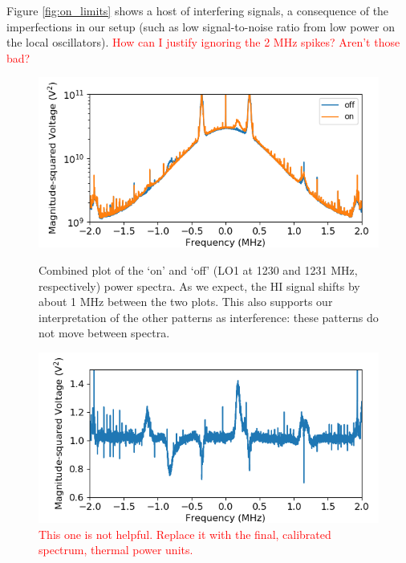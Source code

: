 \documentclass[12pt]{article}
\begin{document}
Figure \ref{fig:on_limits} shows a host of interfering signals, a consequence of the imperfections in our setup (such as low signal-to-noise ratio from low power on the local oscillators). \textcolor{red}{How can I justify ignoring the 2 MHz spikes? Aren't those bad?}

\begin{figure}
\centering
\begin{minipage}{.45\textwidth}
	\centering
	\includegraphics[width=\linewidth]{up_on_off}
	\caption{Combined plot of the `on' and `off' (LO1 at 1230 and 1231 MHz, respectively) power spectra. As we expect, the HI signal shifts by about 1 MHz between the two plots. This also supports our interpretation of the other patterns as interference: these patterns do not move between spectra.}
	\label{fig:up_on_off}
\end{minipage} \hfill%
\begin{minipage}{.45\textwidth}
	\centering
	\includegraphics[width=\linewidth]{up_shape}
	\caption{\textcolor{red}{This one is not helpful. Replace it with the final, calibrated spectrum, thermal power units.}}
	\label{fig:up_shape}
\end{minipage}
\end{figure}
\end{document}
